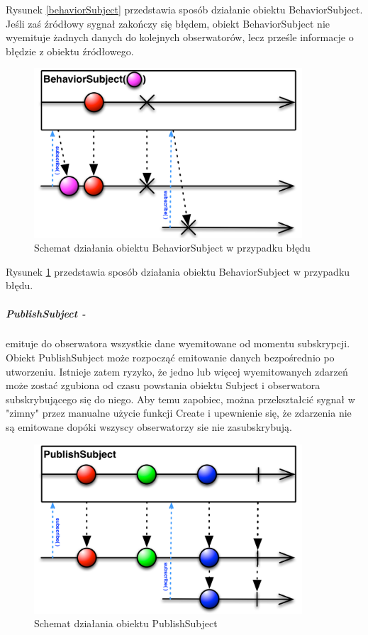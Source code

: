 \documentclass[12pt,oneside,a4paper]{report}
\begin{document}
Rysunek \ref{behaviorSubject} przedstawia sposób działanie obiektu BehaviorSubject. 
Jeśli zaś źródłowy sygnał zakończy się błędem, obiekt BehaviorSubject nie wyemituje żadnych danych do kolejnych obserwatorów, lecz prześle informacje o błędzie z obiektu źródłowego.
\begin{figure}[ht!]
	\centering
	\includegraphics[width=10cm]{behaviorSubjectFailed}
	\caption{Schemat działania obiektu BehaviorSubject w przypadku błędu\cite{subjects}}
	\label{behaviorSubjectFailed}
\end{figure}
Rysunek \ref{behaviorSubjectFailed} przedstawia sposób działania obiektu BehaviorSubject w przypadku błędu.
\subparagraph{PublishSubject -}emituje do obserwatora wszystkie dane wyemitowane od momentu subskrypcji. Obiekt PublishSubject może rozpocząć emitowanie danych bezpośrednio po utworzeniu. Istnieje zatem ryzyko, że jedno lub więcej wyemitowanych zdarzeń może zostać zgubiona od czasu powstania obiektu Subject i obserwatora subskrybującego się do niego. Aby temu zapobiec, można przekształcić sygnał w "zimny" przez manualne użycie funkcji Create i upewnienie się, że zdarzenia nie są emitowane dopóki wszyscy obserwatorzy sie nie zasubskrybują. 
\begin{figure}[ht!]
	\centering
	\includegraphics[width=10cm]{publishSubject}
	\caption{Schemat działania obiektu PublishSubject\cite{subjects}}
	\label{publishSubject}
\end{figure}
\end{document}
